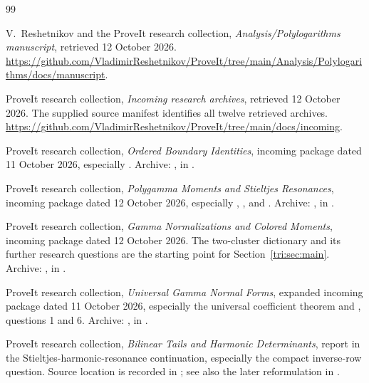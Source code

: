 \begin{thebibliography}{99}
\small
\setlength{\itemsep}{3pt}
\setlength{\parsep}{0pt}
\setlength{\parskip}{0pt}

V.~Reshetnikov and the ProveIt research collection,
\emph{Analysis/Polylogarithms manuscript}, retrieved 12 October 2026.
\url{https://github.com/VladimirReshetnikov/ProveIt/tree/main/Analysis/Polylogarithms/docs/manuscript}.

ProveIt research collection, \emph{Incoming research archives},
retrieved 12 October 2026. The supplied source manifest identifies
all twelve retrieved archives.
\url{https://github.com/VladimirReshetnikov/ProveIt/tree/main/docs/incoming}.

ProveIt research collection,
\emph{Ordered Boundary Identities}, incoming package dated
11 October 2026, especially
.
Archive: ,
in \cite{RepoIncoming}.

ProveIt research collection,
\emph{Polygamma Moments and Stieltjes Resonances}, incoming package
dated 12 October 2026, especially
,
, and
.
Archive: ,
in \cite{RepoIncoming}.

ProveIt research collection,
\emph{Gamma Normalizations and Colored Moments}, incoming package
dated 12 October 2026. The two-cluster dictionary and its further
research questions are the starting point for
Section~\ref{tri:sec:main}.
Archive: ,
in \cite{RepoIncoming}.

ProveIt research collection,
\emph{Universal Gamma Normal Forms}, expanded incoming package dated
11 October 2026, especially the universal coefficient theorem and
, questions 1 and 6.
Archive: ,
in \cite{RepoIncoming}.

ProveIt research collection,
\emph{Bilinear Tails and Harmonic Determinants}, report in the
Stieltjes-harmonic-resonance continuation, especially the compact
inverse-row question. Source location is recorded in
; see also the later reformulation in
\cite{PolygammaResonances}.


\end{thebibliography}
